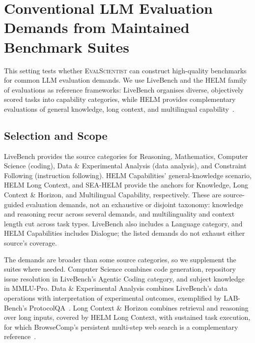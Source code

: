 \documentclass{article} %
\begin{document}
	\section{Conventional LLM Evaluation Demands from Maintained Benchmark Suites}
	\label{app:conventional-demands}
	
	This setting tests whether \textsc{EvalScientist} can construct high-quality
	benchmarks for common LLM evaluation demands. We use LiveBench and the HELM
	family of evaluations as reference frameworks: LiveBench organises diverse,
	objectively scored tasks into capability categories, while HELM provides
	complementary evaluations of general knowledge, long context, and multilingual
	capability~\citep{white2024livebench,xu2025helmcapabilities,helm2025longcontext,susanto2025seahelm}.
	
	\subsection{Selection and Scope}
	
	LiveBench provides the source categories for Reasoning, Mathematics, Computer
	Science (coding), Data \& Experimental Analysis (data analysis), and Constraint
	Following (instruction following). HELM Capabilities' general-knowledge
	scenario, HELM Long Context, and SEA-HELM provide the anchors for Knowledge,
	Long Context \& Horizon, and Multilingual Capability, respectively. These are
	source-guided evaluation demands, not an exhaustive or disjoint taxonomy:
	knowledge and reasoning recur across several demands, and multilinguality and
	context length cut across task types. LiveBench also includes a Language
	category, and HELM Capabilities includes Dialogue; the listed demands do not
	exhaust either source's coverage.
	
	The demands are broader than some source categories, so we supplement the
	suites where needed. Computer Science combines code generation, repository
	issue resolution in LiveBench's Agentic Coding category, and subject knowledge
	in MMLU-Pro. Data \& Experimental Analysis combines LiveBench's data operations
	with interpretation of experimental outcomes, exemplified by LAB-Bench's
	ProtocolQA~\citep{livebenchchangelog,wang2024mmlupro,laurent2024labbench}.
	Long Context \& Horizon combines retrieval and reasoning over long inputs,
	covered by HELM Long Context, with sustained task execution, for which
	BrowseComp's persistent multi-step web search is a complementary
	reference~\citep{helm2025longcontext,wei2025browsecomp}.
	
\end{document}
